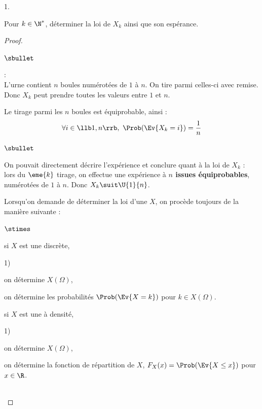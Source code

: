 \begin{noliste}{1.}
\item Pour $k\in\N^*$, déterminer la loi de $X_k$ ainsi que son espérance.
  
  \begin{proof}~
    \begin{noliste}{$\sbullet$}
    \item {} :\\
      L'urne contient $n$ boules numérotées de $1$ à $n$. On tire
      parmi celles-ci avec remise.\\
      Donc $X_k$ peut prendre toutes les valeurs entre $1$ et $n$.
    \item Le tirage parmi les $n$ boules est équiprobable, ainsi :
      \[
      \forall i \in\llb 1,n\rrb, \ \Prob(\Ev{X_k=i})=\dfrac{1}{n}
      \]
    \end{noliste}


    \newpage


    \begin{remark}%
      \begin{noliste}{$\sbullet$}
      \item On pouvait directement décrire l'expérience et conclure
        quant à la loi de $X_k$ :\\
        lors du $\eme{k}$ tirage, on effectue une expérience à {\bf
          $n$ issues équiprobables}, numérotées de $1$ à $n$. Donc
        $X_k \suit \U{1}{n}$.
      \item Lorsqu'on demande de déterminer la loi d'une \var $X$, on 
        procède toujours de la manière suivante :
        \begin{noliste}{$\stimes$}
        \item si $X$ est une \var discrète,
          \begin{noliste}{1)}
          \item on détermine $X(\Omega)$,
          \item on détermine les probabilités $\Prob(\Ev{X=k})$ pour 
            $k\in X(\Omega)$.
          \end{noliste}
          
        \item si $X$ est une \var à densité,
          \begin{noliste}{1)}
          \item on détermine $X(\Omega)$,
          \item on détermine la fonction de répartition de $X$, 
            $F_X(x)=\Prob(\Ev{X\leq x})$ pour 
            $x\in \R$.
          \end{noliste}
        \end{noliste}
      \end{noliste}
    \end{remark}~\\[-1.4cm]
  \end{proof}
  

\end{noliste}
